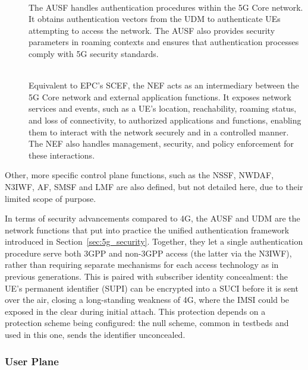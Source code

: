 \begin{description}
\item[{\normalfont{}}]~\\
The \gls{AUSF} handles authentication procedures within the 5G Core network. It obtains authentication vectors from the \gls{UDM} to authenticate \glspl{UE}  attempting to access the network. The \gls{AUSF} also provides security parameters in roaming contexts and ensures that authentication processes comply with 5G security standards.
\item[{\normalfont{}}]~\\
Equivalent to \gls{EPC}'s \gls{SCEF}, the \gls{NEF} acts as an intermediary between the 5G Core network and external application functions. It exposes network services and events, such as a \gls{UE}'s location, reachability, roaming status, and loss of connectivity, to authorized applications and functions, enabling them to interact with the network securely and in a controlled manner. The \gls{NEF} also handles  management, security, and policy enforcement for these interactions.
\end{description}

Other, more specific control plane functions, such as the \gls{NSSF}, \gls{NWDAF}, \gls{N3IWF}, \gls{AF}, \gls{SMSF} and \gls{LMF} are also defined, but not detailed here, due to their limited scope of purpose.

In terms of security advancements compared to 4G, the \gls{AUSF} and \gls{UDM} are the network functions that put into practice the unified authentication framework introduced in Section~\ref{sec:5g_security}. Together, they let a single authentication procedure serve both \gls{3GPP} and non-\gls{3GPP} access (the latter via the \gls{N3IWF}), rather than requiring separate mechanisms for each access technology as in previous generations. This is paired with subscriber identity concealment: the \gls{UE}'s permanent identifier (\gls{SUPI}) can be encrypted into a \gls{SUCI} before it is sent over the air, closing a long-standing weakness of 4G, where the \gls{IMSI} could be exposed in the clear during initial attach. This protection depends on a protection scheme being configured: the null scheme, common in testbeds and used in this one, sends the identifier unconcealed.

\subsubsection{User Plane}
\label{sec:user_plane}

